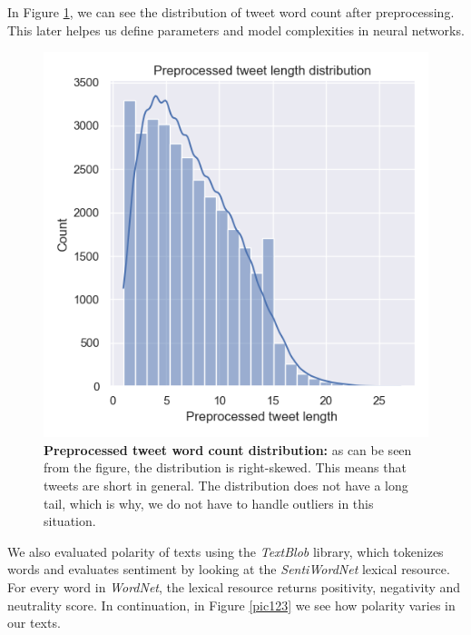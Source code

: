 \documentclass[conference]{IEEEtran}
\begin{document}
In Figure \ref{pic3}, we can see the distribution of tweet word count after preprocessing. This later helpes us define parameters and model complexities in neural networks. 

\begin{figure}[hbt!]\centering
\centering
\includegraphics[width=\linewidth]{tweet-len-distr}
\caption{\textbf{Preprocessed tweet word count distribution:} as can be seen from the figure, the distribution is right-skewed. This means that tweets are short in general. The distribution does not have a long tail, which is why, we do not have to handle outliers in this situation.}
\label{pic3}
\end{figure}

We also evaluated polarity of texts using the \textit{TextBlob} library, which tokenizes words and evaluates sentiment by looking at the \textit{SentiWordNet} \cite{sentilex} lexical resource. For every word in \textit{WordNet}, the lexical resource returns positivity, negativity and neutrality score. In continuation, in Figure \ref{pic123} we see how polarity varies in our texts.
\end{document}
